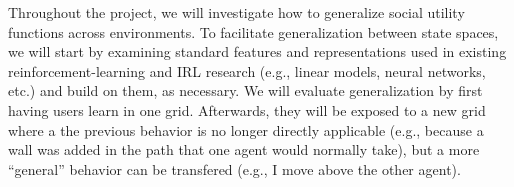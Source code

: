 Throughout the project, we will investigate how to generalize social
utility functions across environments. To facilitate generalization
between state spaces, we will start by examining standard features and
representations used in existing reinforcement-learning and IRL
research (e.g., linear models, neural networks, etc.) and build on
them, as necessary. 
We will evaluate generalization by first having users learn in one
grid. Afterwards, they will be exposed to a new grid where a the
previous behavior is no longer directly applicable (e.g., because a
wall was added in the path that one agent would normally take), but a
more ``general'' behavior can be transfered (e.g., I move above the
other agent). 



